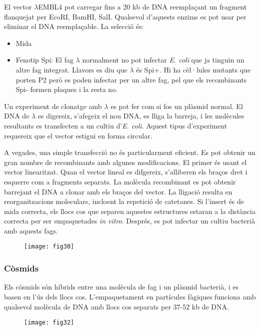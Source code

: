 \begin{itemize}
El vector $\lambda$EMBL4 pot carregar fins a 20 kb de DNA reemplaçant
un fragment flanquejat per EcoRI, BamHI, SalI. Qualsevol d'aquests
enzims es pot usar per eliminar el DNA reemplaçable. La selecció és:
\begin{itemize}
\item Mida
\item Fenotip Spi: El fag $\lambda$ normalment no pot infectar
  \textit{E. coli} que ja tinguin un altre fag integrat. Llavors es
  diu que $\lambda$ és Spi+. Hi ha cèl·lules mutants que porten P2
  però es poden infectar per un altre fag, pel que els recombinants
  Spi- formen plaques i la resta no.
\end{itemize}
\end{itemize}

Un experiment de clonatge amb $\lambda$ es pot fer com si fos un
plàsmid normal. El DNA de $\lambda$ es digereix, s'afegeix el nou DNA,
es lliga la barreja, i les molècules resultants es transfecten a un
cultiu d'\textit{E. coli}. Aquest tipus d'experiment requereix que el
vector estigui en forma circular.

A vegades, una simple transfecció no és particularment eficient. Es
pot obtenir un gran nombre de recombinants amb algunes
modificacions. El primer és usant el vector linearitzat. Quan el
vector lineal es difgereix, s'alliberen els braços dret i esquerre com
a fragments separats. La molècula recombinant es pot obtenir barrejant
el DNA a clonar amb els braços del vector. La lligació resulta en
reorganitzacions moleculars, incloent la repetició de catetanes. Si
l'insert és de mida correcta, els llocs cos que separen aquestes
estructures estaran a la distància correcta per ser empaquetades
\textit{in vitro}. Després, es pot infectar un cultiu bacterià amb
aquests fags.

\begin{figure}[H]
  \centering
  \texttt{[image: fig30]}
  \label{fig:fig31}
\end{figure}

\subsubsection{Còsmids}
\label{sec:cosmids}
Els còsmids són híbrids entre una molècula de fag i un plàsmid
bacterià, i es basen en l'ús dels llocs cos. L'empaquetament en
partícules fàgiques funciona amb qualsevol molècula de DNA amb llocs
cos separats per 37-52 kb de DNA.

\begin{figure}[H]
  \centering
  \texttt{[image: fig32]}
  \label{fig:fig32}
\end{figure}

